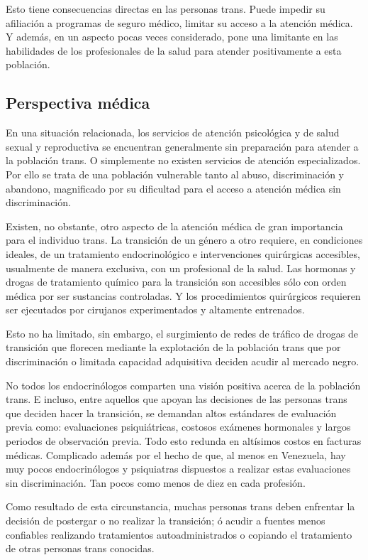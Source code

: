 Esto tiene consecuencias directas en las personas trans. Puede impedir su
afiliación a programas de seguro médico, limitar su acceso a la atención médica.
Y además, en un aspecto pocas veces considerado, pone una limitante en las
habilidades de los profesionales de la salud para atender positivamente a esta
población.

\subsection{Perspectiva médica}

En una situación relacionada, los servicios de atención psicológica y de salud
sexual y reproductiva se encuentran generalmente sin preparación para atender a
la población trans. O simplemente no existen servicios de atención
especializados. Por ello se trata de una población vulnerable tanto al abuso,
discriminación y abandono, magnificado por su dificultad para el acceso a
atención médica sin discriminación.

Existen, no obstante, otro aspecto de la atención médica de gran importancia
para el individuo trans. La transición de un género a otro requiere, en
condiciones ideales, de un tratamiento endocrinológico e intervenciones
quirúrgicas accesibles, usualmente de manera exclusiva, con un profesional de la
salud. Las hormonas y drogas de tratamiento químico para la transición son
accesibles sólo con orden médica por ser sustancias controladas. Y los
procedimientos quirúrgicos requieren ser ejecutados por cirujanos experimentados
y altamente entrenados.

Esto no ha limitado, sin embargo, el surgimiento de redes de tráfico de drogas
de transición que florecen mediante la explotación de la población trans que por
discriminación o limitada capacidad adquisitiva deciden acudir al mercado negro.
	
No todos los endocrinólogos comparten una visión positiva acerca de la población
trans. E incluso, entre aquellos que apoyan las decisiones de las personas trans
que deciden hacer la transición, se demandan altos estándares de evaluación
previa como: evaluaciones psiquiátricas, costosos exámenes hormonales y largos
periodos de observación previa. Todo esto redunda en altísimos costos en
facturas médicas. Complicado además por el hecho de que, al menos en Venezuela,
hay muy pocos endocrinólogos y psiquiatras dispuestos a realizar estas
evaluaciones sin discriminación. Tan pocos como menos de diez en cada profesión.

Como resultado de esta circunstancia, muchas personas trans deben enfrentar la
decisión de postergar o no realizar la transición; ó acudir a fuentes menos
confiables realizando tratamientos autoadministrados o copiando el tratamiento
de otras personas trans conocidas.

